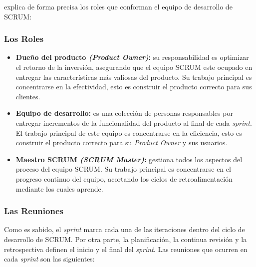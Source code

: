 \cite{Hundermark} explica de forma precisa los roles que conforman el equipo de desarrollo de SCRUM:

		\subsubsection{Los Roles}
			
			\begin{itemize}
				
				\item \textbf{Due\~{n}o del producto \textit{(Product Owner)}:} su responsabilidad es optimizar el retorno de la inversi\'{o}n, asegurando que el equipo SCRUM este ocupado en entregar las caracter\'{i}sticas m\'{a}s valiosas del producto. Su trabajo principal es concentrarse en la efectividad, esto es construir el producto correcto para sus clientes.
				
				\item \textbf{Equipo de desarrollo:} es una colecci\'{o}n de personas responsables por entregar incrementos de la funcionalidad del producto al final de cada \textit{sprint}. El trabajo principal de este equipo es concentrarse en la eficiencia, esto es construir el producto correcto para su \textit{Product Owner} y sus usuarios.
				
				\item \textbf{Maestro SCRUM \textit{(SCRUM Master)}:} gestiona todos los aspectos del proceso del equipo SCRUM. Su trabajo principal es concentrarse en el progreso continuo del equipo, acortando los ciclos de retroalimentaci\'{o}n mediante los cuales aprende.
				
			\end{itemize}
			
		\subsubsection{Las Reuniones}
			Como es sabido, el \textit{sprint} marca cada una de las iteraciones dentro del ciclo de desarrollo de SCRUM. Por otra parte, la planificaci\'{o}n, la continua revisi\'{o}n y la retrospectiva definen el inicio y el final del \textit{sprint}. Las reuniones que ocurren en cada \textit{sprint} son las siguientes:
			
